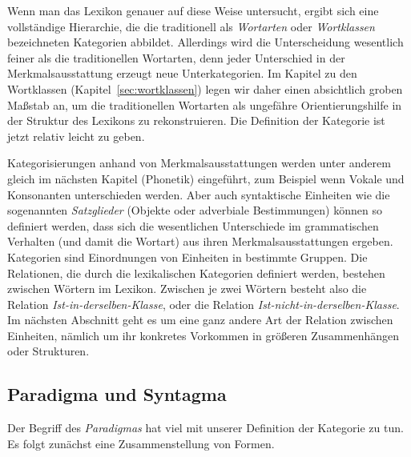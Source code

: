 
Wenn man das Lexikon genauer auf diese Weise untersucht, ergibt sich eine vollständige Hierarchie, die die traditionell als \textit{Wortarten} oder \textit{Wortklassen} bezeichneten Kategorien abbildet.
Allerdings wird die Unterscheidung wesentlich feiner als die traditionellen Wortarten, denn jeder Unterschied in der Merkmalsausstattung erzeugt neue Unterkategorien.
Im Kapitel zu den Wortklassen (Kapitel~\ref{sec:wortklassen}) legen wir daher einen absichtlich groben Maßstab an, um die traditionellen Wortarten als ungefähre Orientierungshilfe in der Struktur des Lexikons zu rekonstruieren.
Die Definition der Kategorie ist jetzt relativ leicht zu geben.


Kategorisierungen anhand von Merkmalsausstattungen werden unter anderem gleich im nächsten Kapitel (Phonetik) eingeführt, zum Beispiel wenn Vokale und Konsonanten unterschieden werden.
Aber auch syntaktische Einheiten wie die sogenannten \textit{Satzglieder} (\zB Objekte oder adverbiale Bestimmungen) können so definiert werden, dass sich die wesentlichen Unterschiede im grammatischen Verhalten (und damit die Wortart) aus ihren Merkmalsausstattungen ergeben.
Kategorien sind Einordnungen von Einheiten in bestimmte Gruppen.
Die Relationen, die durch die lexikalischen Kategorien definiert werden, bestehen zwischen Wörtern im Lexikon.
Zwischen je zwei Wörtern besteht also die Relation \textit{Ist-in-derselben-Klasse}, oder die Relation \textit{Ist-nicht-in-derselben-Klasse}.
Im nächsten Abschnitt geht es um eine ganz andere Art der Relation zwischen Einheiten, nämlich um ihr konkretes Vorkommen in größeren Zusammenhängen oder Strukturen.

\subsection{Paradigma und Syntagma}

\label{sec:paradigmasyntagma}

Der Begriff des \textit{Paradigmas} hat viel mit unserer Definition der Kategorie zu tun.
Es folgt zunächst eine Zusammenstellung von Formen.


